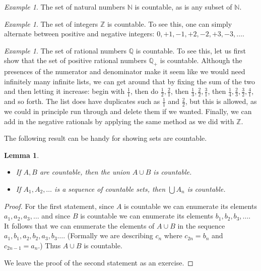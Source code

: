 \documentclass[11pt,oneside]{amsbook}
\newcommand{\N}{\mathbb N}
\newcommand{\Z}{\mathbb Z}
\newcommand{\Q}{\mathbb Q}
\theoremstyle{definition}
\theoremstyle{plain}
\newtheorem{lemma}[theorem]{Lemma}
\theoremstyle{definition}
\theoremstyle{remark}
\newtheorem{example}[theorem]{Example}
\numberwithin{equation}{section}
\numberwithin{figure}{section}
\begin{document}
\begin{example}
  The set of natural numbers $\N$ is countable, as is any subset of $\N$.
\end{example}

\begin{example}
  The set of integers $\Z$ is countable. To see this, one can simply alternate between positive and negative integers: $0,+1,-1,+2,-2,+3,-3,\ldots$.
\end{example}

\begin{example}
  The set of rational numbers $\Q$ is countable. To see this, let us first show that the set of positive rational numbers $\Q_+$ is countable. Although the presences of the numerator and denominator make it seem like we would need infinitely many infinite lists, we can get around that by fixing the sum of the two and then letting it increase: begin with $\frac11$, then do $\frac12,\frac21$, then $\frac13,\frac22,\frac31$, then $\frac14,\frac23,\frac32,\frac41$, and so forth. The list does have duplicates such as $\frac11$ and $\frac22$, but this is allowed, as we could in principle run through and delete them if we wanted. Finally, we can add in the negative rationals by applying the same method as we did with $\Z$.
\end{example}

The following result can be handy for showing sets are countable.

\begin{lemma}
  \begin{itemize}
  \item If $A,B$ are countable, then the union $A\cup B$ is countable.
  \item If $A_1,A_2,\ldots$ is a sequence of countable sets, then $\bigcup A_n$ is countable.
  \end{itemize}
\end{lemma}

\begin{proof}
  For the first statement, since $A$ is countable we can enumerate its elements $a_1,a_2,a_3,\ldots$ and since $B$ is countable we can enumerate its elements $b_1,b_2,b_3,\ldots$. It follows that we can enumerate the elements of $A\cup B$ in the sequence $a_1,b_1,a_2,b_2,a_3,b_3\ldots$. (Formally we are describing $c_n$ where $c_{2n}=b_n$ and $c_{2n-1}=a_n$.) Thus $A\cup B$ is countable.

  We leave the proof of the second statement as an exercise.
\end{proof}
\end{document}
